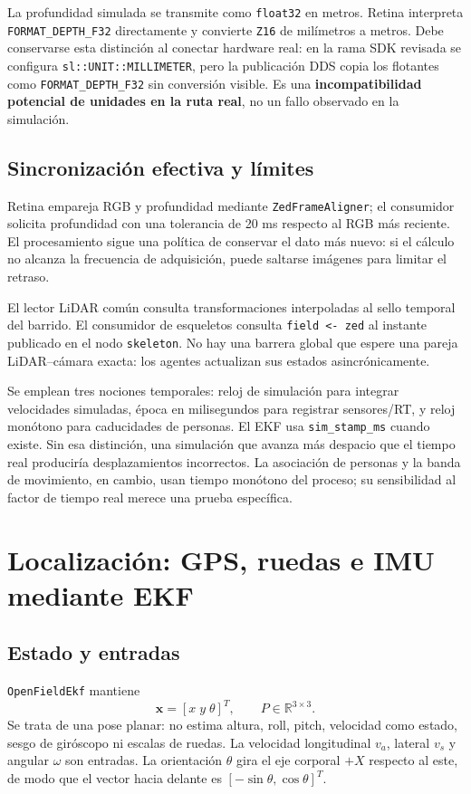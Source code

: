 \documentclass[11pt,a4paper]{article}
\newcommand{\code}[1]{\nolinkurl{#1}}
\newcommand{\R}{\mathbb{R}}
\begin{document}
La profundidad simulada se transmite como \code{float32} en metros. Retina interpreta
\code{FORMAT_DEPTH_F32} directamente y convierte \code{Z16} de milímetros a metros.
Debe conservarse esta distinción al conectar hardware real: en la rama SDK revisada
se configura \code{sl::UNIT::MILLIMETER}, pero la publicación DDS copia los flotantes
como \code{FORMAT_DEPTH_F32} sin conversión visible. Es una \textbf{incompatibilidad
potencial de unidades en la ruta real}, no un fallo observado en la simulación.
\cite{zeddriver,zeddds,mediaplane,reszed}

\subsection{Sincronización efectiva y límites}
Retina empareja RGB y profundidad mediante \code{ZedFrameAligner}; el consumidor
solicita profundidad con una tolerancia de 20 ms respecto al RGB más reciente.
El procesamiento sigue una política de conservar el dato más nuevo: si el cálculo
no alcanza la frecuencia de adquisición, puede saltarse imágenes para limitar el
retraso.~\cite{aligner,mediaplane,zedsource}

El lector LiDAR común consulta transformaciones interpoladas al sello temporal del
barrido. El consumidor de esqueletos consulta \code{field <- zed} al instante
publicado en el nodo \code{skeleton}. No hay una barrera global que espere una pareja
LiDAR--cámara exacta: los agentes actualizan sus estados asincrónicamente.
\cite{lidarreader,skeletonsource}

Se emplean tres nociones temporales: reloj de simulación para integrar velocidades
simuladas, época en milisegundos para registrar sensores/RT, y reloj monótono para
caducidades de personas. El EKF usa \code{sim_stamp_ms} cuando existe. Sin esa
distinción, una simulación que avanza más despacio que el tiempo real produciría
desplazamientos incorrectos. La asociación de personas y la banda de movimiento,
en cambio, usan tiempo monótono del proceso; su sensibilidad al factor de tiempo
real merece una prueba específica.~\cite{openworker,humanworker,skeletonsource}

\section{Localización: GPS, ruedas e IMU mediante EKF}
\label{sec:ekf}

\subsection{Estado y entradas}
\code{OpenFieldEkf} mantiene
\begin{equation}
 \bm{x}=[x\;y\;\theta]^T,\qquad P\in\R^{3\times3}.
\end{equation}
Se trata de una pose planar: no estima altura, roll, pitch, velocidad como estado,
sesgo de giróscopo ni escalas de ruedas. La velocidad longitudinal $v_a$, lateral
$v_s$ y angular $\omega$ son entradas. La orientación $\theta$ gira el eje corporal
$+X$ respecto al este, de modo que el vector hacia delante es
$[-\sin\theta,\cos\theta]^T$.~\cite{ekf,ekfheader}
\end{document}
